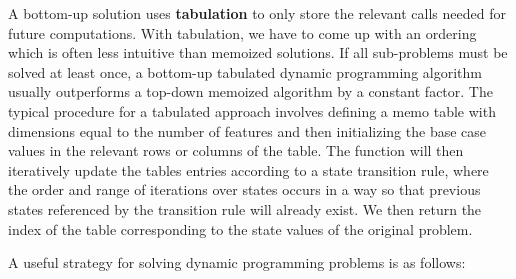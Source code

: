 \documentclass{article}
\newcommand{\bigO}{\mathcal{O}}
\begin{document}
    A bottom-up solution uses \textbf{tabulation} to only store the relevant calls needed for future computations. With tabulation, we have to come up with an ordering which is often less intuitive than memoized solutions. If all sub-problems must be solved at least once, a bottom-up tabulated dynamic programming algorithm usually outperforms a top-down memoized algorithm by a constant factor. The typical procedure for a tabulated approach involves defining a memo table with dimensions equal to the number of features and then initializing the base case values in the relevant rows or columns of the table. The function will then iteratively update the tables entries according to a state transition rule, where the order and range of iterations over states occurs in a way so that previous states referenced by the transition rule will already exist. We then return the index of the table corresponding to the state values of the original problem.

    
    
    A useful strategy for solving dynamic programming problems is as follows:
    
\end{document}
